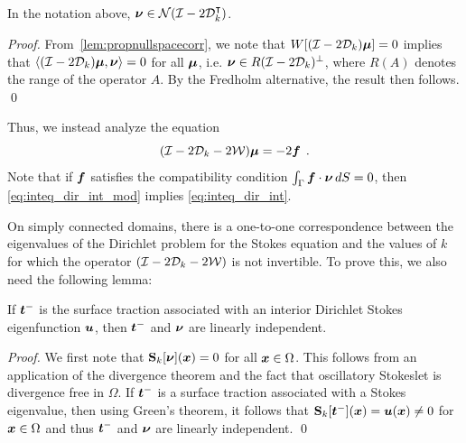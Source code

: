\begin{lemma}
  \label{lem:nunull} In the notation above,
  ${\boldsymbol \nu} \in {\mathcal N}(\mathcal I - 2{\mathcal D}_{k}^{\intercal})$.
\end{lemma}
\begin{proof}
From~\cref{lem:propnullspacecorr}, we note that
$W[(\mathcal I - 2{\mathcal D}_{k}){\boldsymbol \mu}] =0$ implies that
$\left<(\mathcal I -2{\mathcal D}_{k}){\boldsymbol \mu} ,{\boldsymbol \nu} \right> = 0$ for
all ${\boldsymbol \mu}$, i.e. ${\boldsymbol \nu} \in R(\mathcal I - 2{\mathcal D}_{k})^{\perp}$, where
$R(A)$ denotes the range of the operator $A$. 
By the Fredholm alternative, the result then follows.
\qed
\end{proof}
Thus, we instead analyze the equation
\begin{equation}
(\mathcal I - 2{\mathcal D}_{k}  -2{\mathcal W}) {\boldsymbol \mu} = -2{\boldsymbol f} \; \, . \label{eq:inteq_dir_int_mod}
\end{equation}
Note that if ${\boldsymbol f}$ satisfies the compatibility
condition $\int_\Gamma {\boldsymbol f} \cdot {\boldsymbol \nu} \, dS =0$, then
\cref{eq:inteq_dir_int_mod} implies \cref{eq:inteq_dir_int}.

On simply connected domains, there is a one-to-one correspondence between
the eigenvalues of the Dirichlet problem for
the Stokes equation
and the values of $k$ for which the operator $(\mathcal I - 2{\mathcal D}_{k} - 2{\mathcal W})$
is not invertible. To prove this, we also need the 
following lemma:
\begin{lemma}
  \label{lem:nutracli}
  If ${\boldsymbol t}^{-}$ is the surface traction associated
  with an interior Dirichlet Stokes eigenfunction ${\boldsymbol u}$,
  then ${\boldsymbol t}^{-}$ and ${\boldsymbol \nu}$ are linearly independent.
\end{lemma}
\begin{proof}
We first note that ${\bf S}_{k}[{\boldsymbol \nu}]({\boldsymbol x}) = 0$ for all ${\boldsymbol x} \in \Omega$.
This follows from an application of the divergence
theorem and the fact that
oscillatory Stokeslet is divergence free in $\Omega$. 
If ${\boldsymbol t}^{-}$ is a surface traction associated with
a Stokes eigenvalue, then
using Green's theorem, it follows that
${\bf S}_{k}[{\boldsymbol t}^{-}]({\boldsymbol x}) = {\boldsymbol u}({\boldsymbol x}) \neq 0$ for ${\boldsymbol x} \in \Omega$ and
thus ${\boldsymbol t}^{-}$ and ${\boldsymbol \nu}$ are linearly independent.
\qed
\end{proof}

